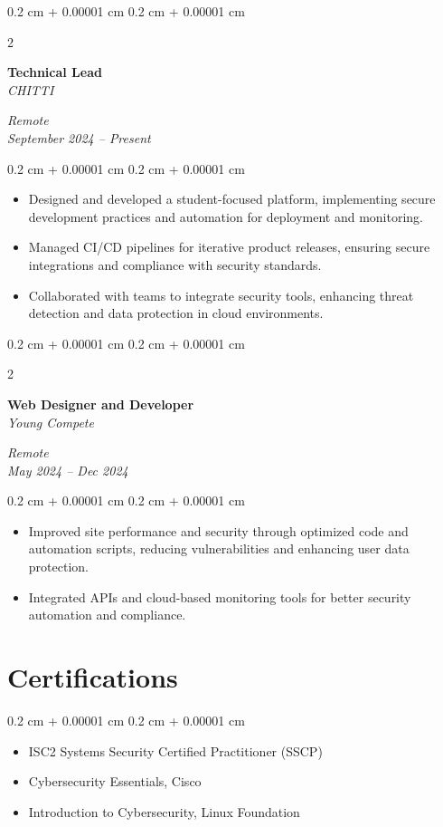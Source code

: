 \documentclass[10pt, letterpaper]{article}
\newenvironment{highlights}{
    \begin{itemize}[
        topsep=0.10 cm,
        parsep=0.10 cm,
        partopsep=0pt,
        itemsep=0pt,
        leftmargin=0.4 cm + 10pt
    ]
}{
    \end{itemize}
} %
\newenvironment{onecolentry}{
    \begin{adjustwidth}{
        0.2 cm + 0.00001 cm
    }{
        0.2 cm + 0.00001 cm
    }
}{
    \end{adjustwidth}
} %
\newenvironment{twocolentry}[2][]{
    \onecolentry
    \def\secondColumn{#2}
    \setcolumnwidth{\fill, 4.5 cm}
    \begin{paracol}{2}
}{
    \switchcolumn \raggedleft \secondColumn
    \end{paracol}
    \endonecolentry
} %
\begin{document}
    \vspace{0.2 cm}
    \begin{twocolentry}{
        \textit{Remote} \\
        \textit{September 2024 – Present}
    }
        \textbf{Technical Lead} \\
        \textit{CHITTI}
    \end{twocolentry}
    \vspace{0.10 cm}
    \begin{onecolentry}
        \begin{highlights}
            \item Designed and developed a student-focused platform, implementing secure development practices and automation for deployment and monitoring.
            \item Managed CI/CD pipelines for iterative product releases, ensuring secure integrations and compliance with security standards.
            \item Collaborated with teams to integrate security tools, enhancing threat detection and data protection in cloud environments.
        \end{highlights}
    \end{onecolentry}

    \vspace{0.2 cm}
    \begin{twocolentry}{
        \textit{Remote} \\
        \textit{May 2024 – Dec 2024}
    }
        \textbf{Web Designer and Developer} \\
        \textit{Young Compete}
    \end{twocolentry}
    \vspace{0.10 cm}
    \begin{onecolentry}
        \begin{highlights}
            \item Improved site performance and security through optimized code and automation scripts, reducing vulnerabilities and enhancing user data protection.
            \item Integrated APIs and cloud-based monitoring tools for better security automation and compliance.
        \end{highlights}
    \end{onecolentry}

    \section{Certifications}
    \begin{onecolentry}
        \begin{highlights}
            \item ISC2 Systems Security Certified Practitioner (SSCP)
            \item Cybersecurity Essentials, Cisco
            \item Introduction to Cybersecurity, Linux Foundation
        \end{highlights}
    \end{onecolentry}
\end{document}
